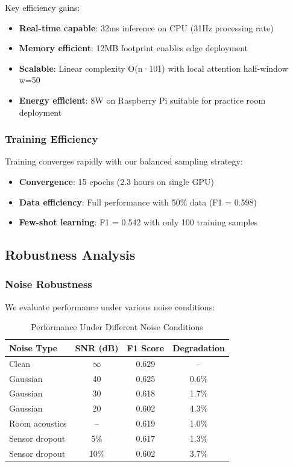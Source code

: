 \documentclass[sigconf,review,anonymous]{acmart}
\begin{document}
Key efficiency gains:
\begin{itemize}
\item \textbf{Real-time capable}: 32ms inference on CPU (31Hz processing rate)
\item \textbf{Memory efficient}: 12MB footprint enables edge deployment
\item \textbf{Scalable}: Linear complexity O(n·101) with local attention half-window w=50
\item \textbf{Energy efficient}: 8W on Raspberry Pi suitable for practice room deployment
\end{itemize}

\subsubsection{Training Efficiency}
Training converges rapidly with our balanced sampling strategy:

\begin{itemize}
\item \textbf{Convergence}: 15 epochs (2.3 hours on single GPU)
\item \textbf{Data efficiency}: Full performance with 50\% data (F1 = 0.598)
\item \textbf{Few-shot learning}: F1 = 0.542 with only 100 training samples
\end{itemize}

\subsection{Robustness Analysis}

\subsubsection{Noise Robustness}
We evaluate performance under various noise conditions:

\begin{table}[h!]
  \caption{Performance Under Different Noise Conditions}
  \begin{tabular}{l|ccc}
    \toprule
    Noise Type & SNR (dB) & F1 Score & Degradation\\
    \midrule
    Clean & $\infty$ & 0.629 & --\\
    Gaussian & 40 & 0.625 & 0.6\%\\
    Gaussian & 30 & 0.618 & 1.7\%\\
    Gaussian & 20 & 0.602 & 4.3\%\\
    Room acoustics & -- & 0.619 & 1.0\%\\
    Sensor dropout & 5\% & 0.617 & 1.3\%\\
    Sensor dropout & 10\% & 0.602 & 3.7\%\\
    \bottomrule
  \end{tabular}
  \label{tab:noise_robustness}
\end{table}
\end{document}
